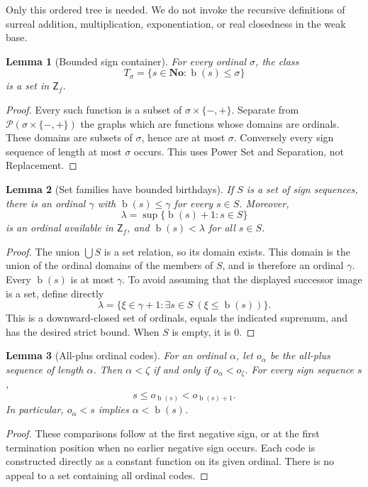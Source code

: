 \documentclass[11pt,letterpaper]{article}
\newtheorem{lemma}[lemma]{Lemma}\aliascntresetthe{lemma}
\theoremstyle{definition}
\theoremstyle{remark}
\newcommand{\No}{\mathbf{No}}
\newcommand{\bd}{\operatorname{b}}
\newcommand{\Pow}{\mathcal P}
\newcommand{\Zf}{\mathsf{Z}_{\!f}}
\newcommand{\signs}{\{-,+\}}
\begin{document}
Only this ordered tree is needed. We do not invoke the recursive definitions of surreal addition, multiplication, exponentiation, or real closedness in the weak base.

\begin{lemma}[Bounded sign container]
\label{hset:zr:lem:container}
For every ordinal $\sigma$, the class
\[
T_\sigma=\{s\in\No:\bd(s)\leq\sigma\}
\]
is a set in $\Zf$.
\end{lemma}
\begin{proof}
Every such function is a subset of $\sigma\times\signs$. Separate from $\Pow(\sigma\times\signs)$ the graphs which are functions whose domains are ordinals. These domains are subsets of $\sigma$, hence are at most $\sigma$. Conversely every sign sequence of length at most $\sigma$ occurs. This uses Power Set and Separation, not Replacement.
\end{proof}

\begin{lemma}[Set families have bounded birthdays]
\label{hset:zr:lem:setbounds}
If $S$ is a set of sign sequences, there is an ordinal $\gamma$ with $\bd(s)\leq\gamma$ for every $s\in S$. Moreover,
\[
\lambda=\sup\{\bd(s)+1:s\in S\}
\]
is an ordinal available in $\Zf$, and $\bd(s)<\lambda$ for all $s\in S$.
\end{lemma}
\begin{proof}
The union $\bigcup S$ is a set relation, so its domain exists. This domain is the union of the ordinal domains of the members of $S$, and is therefore an ordinal $\gamma$. Every $\bd(s)$ is at most $\gamma$. To avoid assuming that the displayed successor image is a set, define directly
\[
\lambda=\{\xi\in\gamma+1:\exists s\in S\ (\xi\leq\bd(s))\}.
\]
This is a downward-closed set of ordinals, equals the indicated supremum, and has the desired strict bound. When $S$ is empty, it is $0$.
\end{proof}

\begin{lemma}[All-plus ordinal codes]
\label{hset:zr:lem:ordcode}
For an ordinal $\alpha$, let $o_\alpha$ be the all-plus sequence of length $\alpha$. Then $\alpha<\zeta$ if and only if $o_\alpha<o_\zeta$. For every sign sequence $s$,
\[
s\leq o_{\bd(s)}<o_{\bd(s)+1}.
\]
In particular, $o_\alpha<s$ implies $\alpha<\bd(s)$.
\end{lemma}
\begin{proof}
These comparisons follow at the first negative sign, or at the first termination position when no earlier negative sign occurs. Each code is constructed directly as a constant function on its given ordinal. There is no appeal to a set containing all ordinal codes.
\end{proof}
\end{document}
